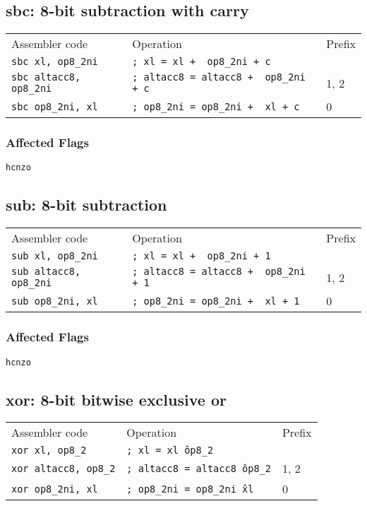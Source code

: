 \documentclass{book}
\begin{document}
\subsection{sbc: 8-bit subtraction with carry}

\begin{tabular}{l l l}
Assembler code                 & Operation                                    & Prefix \\
\texttt{sbc xl, op8\_2ni}      & \texttt{; xl = xl + ~op8\_2ni + c}           & \\
\texttt{sbc altacc8, op8\_2ni} & \texttt{; altacc8 = altacc8 + ~op8\_2ni + c} & 1, 2 \\
\texttt{sbc op8\_2ni, xl}      & \texttt{; op8\_2ni = op8\_2ni + ~xl + c}     & 0
\end{tabular}

\subsubsection*{Affected Flags}

\texttt{hcnzo}


\subsection{sub: 8-bit subtraction}

\begin{tabular}{l l l}
Assembler code                 & Operation                                    & Prefix \\
\texttt{sub xl, op8\_2ni}      & \texttt{; xl = xl + ~op8\_2ni + 1}           & \\
\texttt{sub altacc8, op8\_2ni} & \texttt{; altacc8 = altacc8 + ~op8\_2ni + 1} & 1, 2 \\
\texttt{sub op8\_2ni, xl}      & \texttt{; op8\_2ni = op8\_2ni + ~xl + 1}     & 0
\end{tabular}

\subsubsection*{Affected Flags}

\texttt{hcnzo}


\subsection{xor: 8-bit bitwise exclusive or}

\begin{tabular}{l l l}
Assembler code               & Operation                              & Prefix \\
\texttt{xor xl, op8\_2}      & \texttt{; xl = xl \^ op8\_2}           & \\
\texttt{xor altacc8, op8\_2} & \texttt{; altacc8 = altacc8 \^ op8\_2} & 1, 2 \\
\texttt{xor op8\_2ni, xl}    & \texttt{; op8\_2ni = op8\_2ni \^ xl}   & 0
\end{tabular}
\end{document}
